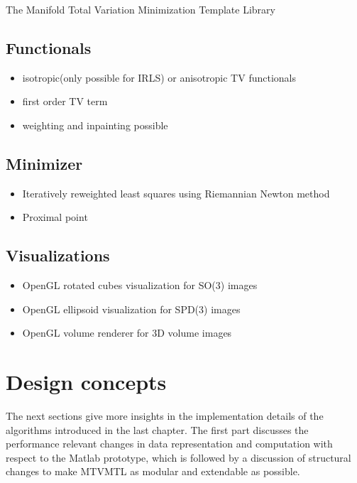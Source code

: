 \begin{chapter}{The Manifold Total Variation Minimization Template Library}
\subsection*{Functionals} %
\label{sub:Functionals}
\begin{itemize}
    \item isotropic(only possible for IRLS) or anisotropic TV functionals
    \item first order TV term
    \item weighting and inpainting possible
\end{itemize}

\subsection*{Minimizer} %
\label{sub:Minimizer}
\begin{itemize}
	\item Iteratively reweighted least squares using Riemannian Newton method
	\item Proximal point
\end{itemize}

\subsection*{Visualizations} %
\label{sub:Visualizations}
\begin{itemize}
    \item OpenGL rotated cubes visualization for SO(3) images
    \item OpenGL ellipsoid visualization for SPD(3) images
    \item OpenGL volume renderer for 3D volume images
\end{itemize}


\section{Design concepts} %
\label{sec:Design}
The next sections give more insights in the implementation details of the algorithms introduced in the last chapter.
The first part discusses the performance relevant changes in data representation and computation
with respect to the Matlab prototype, which is followed by a discussion of structural changes to make
MTVMTL as modular and extendable as possible.\\


\end{chapter}
